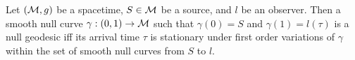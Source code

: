 %
%
%
\begin{theorem}\label{}
Let $(\mathcal{M}, g)$ be a spacetime, $S \in \mathcal{M}$ be a source, and $l$ be an observer. Then a smooth null curve $\gamma: (0,1) \to \mathcal{M}$ such that $\gamma(0) = S$ and $\gamma(1) = l(\tau)$ is a null geodesic iff its arrival time $\tau$ is stationary under first order variations of $\gamma$ within the set of smooth null curves from $S$ to $l$.
\end{theorem}
